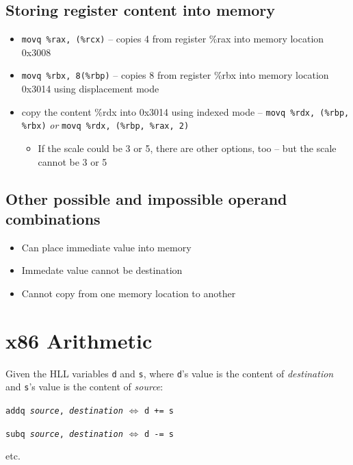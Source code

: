 \documentclass{article}
\begin{document}
\subsection{Storing register content into memory}

\begin{itemize}
\item \texttt{movq \%rax, (\%rcx)} -- copies 4 from register \%rax into memory location 0x3008
\item \texttt{movq \%rbx, 8(\%rbp)} -- copies 8 from register \%rbx into memory location 0x3014 using displacement mode
\item copy the content \%rdx into 0x3014 using indexed mode -- \texttt{movq \%rdx, (\%rbp, \%rbx)} \textit{or} \texttt{movq \%rdx, (\%rbp, \%rax, 2)}
    \begin{itemize}
    \item If the scale could be 3 or 5, there are other options, too -- but the scale cannot be 3 or 5
    \end{itemize}
\end{itemize}

\subsection{Other possible and impossible operand combinations}

\begin{itemize}
\item Can place immediate value into memory
\item Immedate value cannot be destination
\item Cannot copy from one memory location to another
\end{itemize}

\section{x86 Arithmetic}

Given the HLL variables \texttt{d} and \texttt{s}, where \texttt{d}'s value is the content of \textit{destination} and \texttt{s}'s value is the content of \textit{source}:

\texttt{addq \textit{source}, \textit{destination}} $\Leftrightarrow$ \texttt{d += s}

\texttt{subq \textit{source}, \textit{destination}} $\Leftrightarrow$ \texttt{d -= s}

etc.
\end{document}
